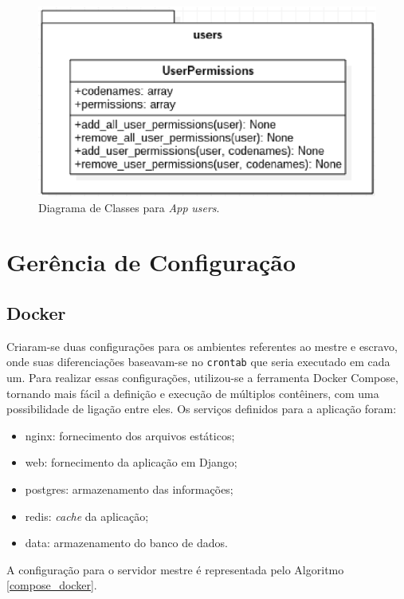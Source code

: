 \begin{figure}[!h]
    \centering
    \includegraphics[keepaspectratio=true,scale=0.8]{figuras/app_users.eps}
    \caption{Diagrama de Classes para \textit{App} \textit{users}.}
    \label{app_users}
\end{figure}

\section{Gerência de Configuração}

\subsection{Docker}
Criaram-se duas configurações para os ambientes referentes ao mestre e escravo, onde suas diferenciações baseavam-se no \verb|crontab| que seria executado em cada um. Para realizar essas configurações, utilizou-se a ferramenta Docker Compose, tornando mais fácil a definição e execução de múltiplos contêiners, com uma possibilidade de ligação entre eles. Os serviços definidos para a aplicação foram:

\begin{itemize}
    \item nginx: fornecimento dos arquivos estáticos;
    \item web: fornecimento da aplicação em Django;
    \item postgres: armazenamento das informações;
    \item redis: \textit{cache} da aplicação;
    \item data: armazenamento do banco de dados.
\end{itemize}

A configuração para o servidor mestre é representada pelo Algoritmo \ref{compose_docker}.

